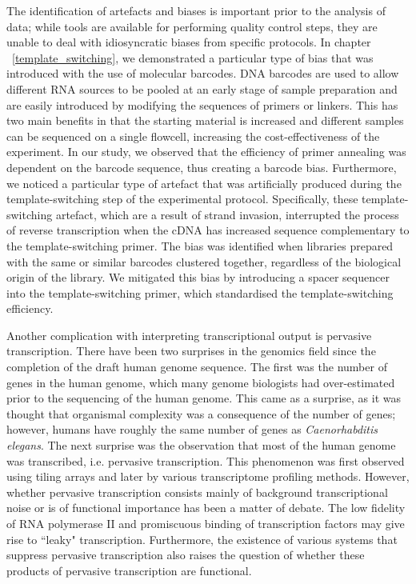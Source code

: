 The identification of artefacts and biases is important prior to the analysis of data; while tools\cite{pmid19737799, fastqc} are available for performing quality control steps, they are unable to deal with idiosyncratic biases from specific protocols. In chapter ~\ref{template_switching}, we demonstrated a particular type of bias that was introduced with the use of molecular barcodes. DNA barcodes are used to allow different RNA sources to be pooled at an early stage of sample preparation and are easily introduced by modifying the sequences of primers or linkers. This has two main benefits in that the starting material is increased and different samples can be sequenced on a single flowcell, increasing the cost-effectiveness of the experiment. In our study, we observed that the efficiency of primer annealing was dependent on the barcode sequence\cite{Tang01022013}, thus creating a barcode bias. Furthermore, we noticed a particular type of artefact that was artificially produced during the template-switching step of the experimental protocol\cite{Tang01022013}. Specifically, these template-switching artefact, which are a result of strand invasion, interrupted the process of reverse transcription when the cDNA has increased sequence complementary to the template-switching primer. The bias was identified when libraries prepared with the same or similar barcodes clustered together, regardless of the biological origin of the library. We mitigated this bias by introducing a spacer sequencer into the template-switching primer, which standardised the template-switching efficiency.

Another complication with interpreting transcriptional output is pervasive transcription. There have been two surprises in the genomics field since the completion of the draft human genome sequence\cite{lander2001initial,venter2001sequence}. The first was the number of genes in the human genome, which many genome biologists had over-estimated prior to the sequencing of the human genome\cite{genesweep}. This came as a surprise, as it was thought that organismal complexity was a consequence of the number of genes; however, humans have roughly the same number of genes as \textit{Caenorhabditis elegans}. The next surprise was the observation that most of the human genome was transcribed\cite{pmid11988577, pmid17571346}, i.e. pervasive transcription. This phenomenon was first observed using tiling arrays\cite{pmid17510325} and later by various transcriptome profiling methods\cite{pmid22955620}. However, whether pervasive transcription consists mainly of background transcriptional noise or is of functional importance has been a matter of debate. The low fidelity of RNA polymerase II\cite{pmid17277804} and promiscuous binding of transcription factors\cite{pmid22868264} may give rise to ``leaky" transcription. Furthermore, the existence of various systems that suppress pervasive transcription\cite{pmid24267449} also raises the question of whether these products of pervasive transcription are functional.

